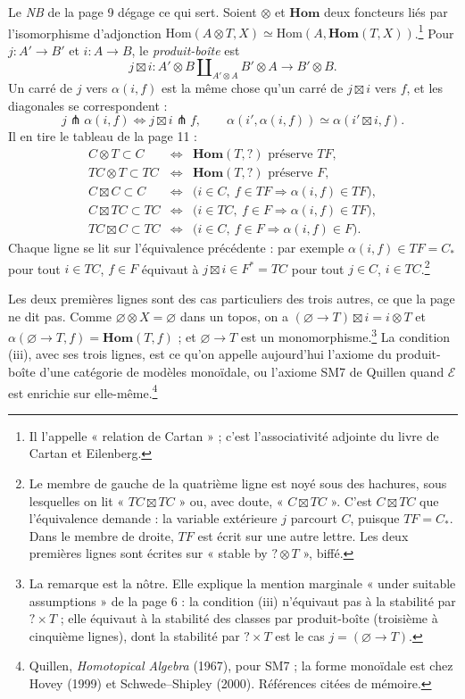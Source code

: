 \documentclass[11pt,a4paper]{article}
\begin{document}
Le \emph{NB} de la page 9 dégage ce qui sert. Soient $\otimes$ et
$\mathbf{Hom}$ deux foncteurs liés par l'isomorphisme d'adjonction
$\mathrm{Hom}(A \otimes T, X) \simeq \mathrm{Hom}(A, \mathbf{Hom}(T,
X))$.\footnote{Il l'appelle « relation de Cartan » ; c'est l'associativité
adjointe du livre de Cartan et Eilenberg.} Pour $j : A' \to B'$ et
$i : A \to B$, le \emph{produit-boîte} est
\[
j \boxtimes i : A' \otimes B \amalg_{A' \otimes A} B' \otimes A
\longrightarrow B' \otimes B .
\]
Un carré de $j$ vers $\alpha(i,f)$ est la même chose qu'un carré de
$j \boxtimes i$ vers $f$, et les diagonales se correspondent :
\[
j \pitchfork \alpha(i,f) \iff j \boxtimes i \pitchfork f, \qquad
\alpha(i', \alpha(i,f)) \simeq \alpha(i' \boxtimes i, f) .
\]
Il en tire le tableau de la page 11 :
\[
\begin{array}{rcl}
C \otimes T \subset C & \iff & \mathbf{Hom}(T, ?) \text{ préserve } TF, \\
TC \otimes T \subset TC & \iff & \mathbf{Hom}(T, ?) \text{ préserve } F, \\
C \boxtimes C \subset C & \iff & \bigl( i \in C,\ f \in TF \Rightarrow \alpha(i,f) \in TF \bigr), \\
C \boxtimes TC \subset TC & \iff & \bigl( i \in TC,\ f \in F \Rightarrow \alpha(i,f) \in TF \bigr), \\
TC \boxtimes C \subset TC & \iff & \bigl( i \in C,\ f \in F \Rightarrow \alpha(i,f) \in F \bigr).
\end{array}
\]
Chaque ligne se lit sur l'équivalence précédente : par exemple
$\alpha(i,f) \in TF = C_*$ pour tout $i \in TC$, $f \in F$ équivaut à
$j \boxtimes i \in F^* = TC$ pour tout $j \in C$, $i \in TC$.\footnote{Le
membre de gauche de la quatrième ligne est noyé sous des hachures, sous
lesquelles on lit « $TC \boxtimes TC$ » ou, avec doute, « $C \boxtimes TC$ ».
C'est $C \boxtimes TC$ que l'équivalence demande : la variable extérieure $j$
parcourt $C$, puisque $TF = C_*$. Dans le membre de droite, $TF$ est écrit
sur une autre lettre. Les deux premières lignes sont écrites sur
« stable by $? \otimes T$ », biffé.}

Les deux premières lignes sont des cas particuliers des trois autres, ce que la
page ne dit pas. Comme $\varnothing \otimes X = \varnothing$ dans un topos, on
a $(\varnothing \to T) \boxtimes i = i \otimes T$ et
$\alpha(\varnothing \to T, f) = \mathbf{Hom}(T, f)$ ; et
$\varnothing \to T$ est un monomorphisme.\footnote{La remarque est la nôtre.
Elle explique la mention marginale « under suitable assumptions » de la page
6 : la condition (iii) n'équivaut pas à la stabilité par $? \times T$ ; elle
équivaut à la stabilité des classes par produit-boîte (troisième à cinquième
lignes), dont la stabilité par $? \times T$ est le cas
$j = (\varnothing \to T)$.} La condition (iii), avec ses trois lignes, est ce
qu'on appelle aujourd'hui l'axiome du produit-boîte d'une catégorie de
modèles monoïdale, ou l'axiome SM7 de Quillen quand $\mathcal{E}$ est enrichie
sur elle-même.\footnote{Quillen, \emph{Homotopical Algebra} (1967), pour SM7 ;
la forme monoïdale est chez Hovey (1999) et Schwede--Shipley (2000).
Références citées de mémoire.}
\end{document}
